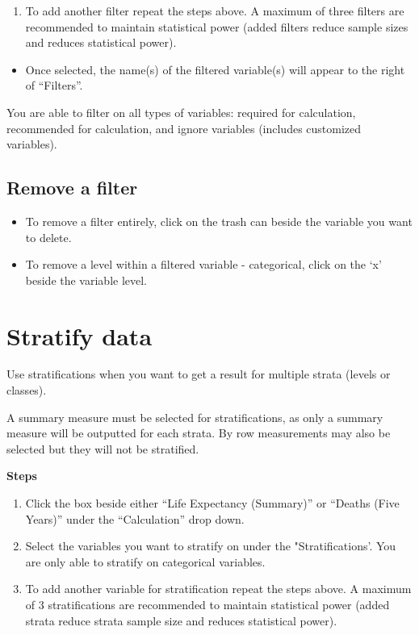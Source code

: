 \documentclass[]{book}
\providecommand{\tightlist}{%
  \setlength{\itemsep}{0pt}\setlength{\parskip}{0pt}}
\begin{document}
\begin{enumerate}
\def\labelenumi{\arabic{enumi}.}
\setcounter{enumi}{3}
\tightlist
\item
  To add another filter repeat the steps above. A maximum of three filters are recommended to maintain statistical power (added filters reduce sample sizes and reduces statistical power).
\end{enumerate}

\begin{itemize}
\tightlist
\item
  Once selected, the name(s) of the filtered variable(s) will appear to the right of ``Filters''.
\end{itemize}

You are able to filter on all types of variables: required for calculation, recommended for calculation, and ignore variables (includes customized variables).

\hypertarget{remove-a-filter}{%
\subsection{Remove a filter}\label{remove-a-filter}}

\begin{itemize}
\item
  To remove a filter entirely, click on the trash can beside the variable you want to delete.
\item
  To remove a level within a filtered variable - categorical, click on the `x' beside the variable level.
\end{itemize}

\hypertarget{stratify-data}{%
\section{Stratify data}\label{stratify-data}}

Use stratifications when you want to get a result for multiple strata (levels or classes).

A summary measure must be selected for stratifications, as only a summary measure will be outputted for each strata. By row measurements may also be selected but they will not be stratified.

\textbf{Steps}

\begin{enumerate}
\def\labelenumi{\arabic{enumi}.}
\item
  Click the box beside either ``Life Expectancy (Summary)'' or ``Deaths (Five Years)'' under the ``Calculation'' drop down.
\item
  Select the variables you want to stratify on under the "Stratifications'. You are only able to stratify on categorical variables.
\item
  To add another variable for stratification repeat the steps above. A maximum of 3 stratifications are recommended to maintain statistical power (added strata reduce strata sample size and reduces statistical power).
\end{enumerate}
\end{document}
